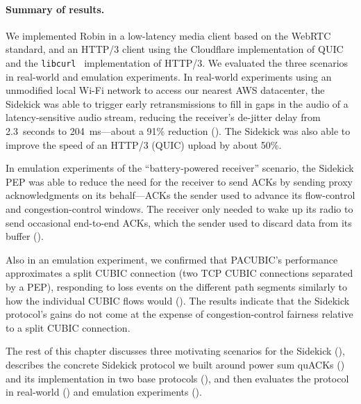\paragraph{Summary of results.}

We implemented Robin in a low-latency media client
based on the WebRTC standard, and an HTTP/3 client using the Cloudflare
implementation of QUIC~\cite{quiche} and the \texttt{libcurl}~\cite{libcurl}
implementation of HTTP/3. We evaluated the three scenarios in
real-world and emulation experiments.
In real-world experiments using an unmodified local Wi-Fi network to access our
nearest AWS datacenter, the Sidekick was able to trigger early retransmissions
to fill in gaps in the audio of a latency-sensitive audio stream, reducing the
receiver's de-jitter delay from 2.3~seconds to 204~ms---about a 91\% reduction
(). The Sidekick was also able to improve the speed of an
HTTP/3 (QUIC) upload by about 50\%.

In emulation experiments of the ``battery-powered receiver'' scenario,
the Sidekick PEP was able to reduce the need for the receiver to send ACKs
by sending proxy acknowledgments on its behalf---ACKs the sender used
to advance its flow-control and congestion-control windows. The
receiver only needed to wake up its radio to send occasional
end-to-end ACKs, which the sender used to discard data from its
buffer ().

Also in an emulation experiment, we confirmed that PACUBIC's
performance approximates a split CUBIC connection (two TCP CUBIC
connections separated by a PEP), responding to loss events on the
different path segments similarly to how the individual CUBIC flows would
(). The results indicate that the Sidekick protocol's gains
do not come at the
expense of congestion-control fairness relative to a split CUBIC connection.

\smallskip

The rest of this chapter discusses three motivating scenarios for the Sidekick
(), describes the concrete Sidekick protocol we
built around power sum quACKs () and
its implementation in two base protocols (),
and then evaluates the protocol in real-world ()
and emulation experiments ().
